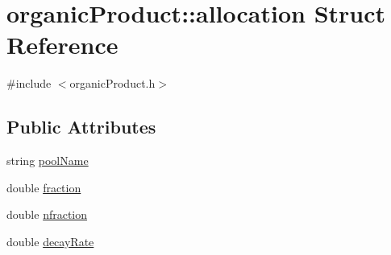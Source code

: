 \hypertarget{structorganic_product_1_1allocation}{
\section{organicProduct::allocation Struct Reference}
\label{structorganic_product_1_1allocation}
}


{\ttfamily \#include $<$organicProduct.h$>$}\subsection*{Public Attributes}
\begin{DoxyCompactItemize}
\item 
string \hyperlink{structorganic_product_1_1allocation_a9dfa44d3c9a2b6c6bfd607455ba7eac9}{poolName}
\item 
double \hyperlink{structorganic_product_1_1allocation_a2e691dee8b1f9800af303e6aff5230d4}{fraction}
\item 
double \hyperlink{structorganic_product_1_1allocation_a41b380701a6c881409e4d1297fbf8517}{nfraction}
\item 
double \hyperlink{structorganic_product_1_1allocation_a5cf7db6c1de20c19c5158f94f4b504b5}{decayRate}
\end{DoxyCompactItemize}


